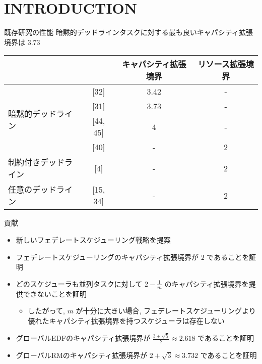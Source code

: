 
\section{INTRODUCTION}
\label{sec: introduction}

\begin{frame}{既存研究の性能}
    暗黙的デッドラインタスクに対する最も良いキャパシティ拡張境界は $3.73$
    \begin{table}[]
        \begin{tabular}{|l|c|c|c|}
            \hline
                                                & \multicolumn{1}{l|}{} & キャパシティ拡張境界 & リソース拡張境界 \\ \hline
            \multirow{4}{*}{暗黙的デッドライン} & {[}32{]}              & 3.42                 & -                \\ \cline{2-4}
                                                & {[}31{]}              & 3.73                 & -                \\ \cline{2-4}
                                                & {[}44, 45{]}          & 4                    & -                \\ \cline{2-4}
                                                & {[}40{]}              & -                    & 2                \\ \hline
            制約付きデッドライン                & {[}4{]}               & -                    & 2                \\ \hline
            任意のデッドライン                  & {[}15, 34{]}          & -                    & 2                \\ \hline
        \end{tabular}
    \end{table}
\end{frame}

\begin{frame}{貢献}
    \begin{itemize}
        \item 新しいフェデレートスケジューリング戦略を提案
        \item フェデレートスケジューリングのキャパシティ拡張境界が $2$ であることを証明
        \item どのスケジューラも並列タスクに対して $2 - \frac{1}{m}$ のキャパシティ拡張境界を提供できないことを証明
        \begin{itemize}
            \item したがって, $m$ が十分に大きい場合, フェデレートスケジューリングより優れたキャパシティ拡張境界を持つスケジューラは存在しない
        \end{itemize}
        \item グローバルEDFのキャパシティ拡張境界が $\frac{3+\sqrt{5}}{2} \approx 2.618$ であることを証明
        \item グローバルRMのキャパシティ拡張境界が $2+\sqrt{3} \approx 3.732$ であることを証明
    \end{itemize}
\end{frame}
